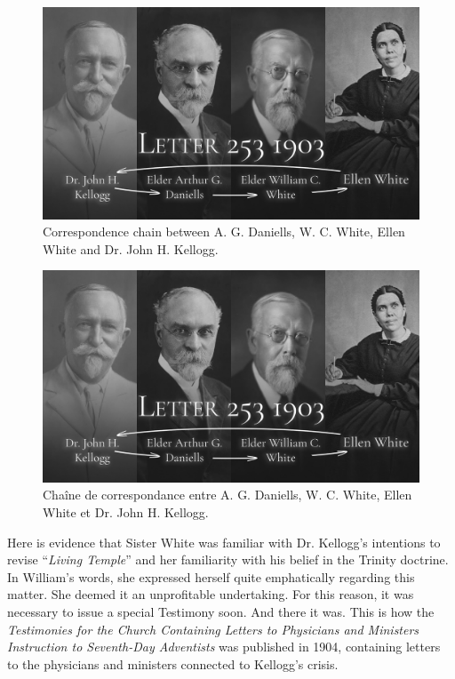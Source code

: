 \begin{figure}[h]
    \centering
    \includegraphics[width=1\linewidth]{images/correspondance.jpg}
    \caption*{Correspondence chain between A. G. Daniells, W. C. White, Ellen White and Dr. John H. Kellogg.}
    \label{fig:corespondance}
\end{figure}


\begin{figure}[h]
    \centering
    \includegraphics[width=1\linewidth]{images/correspondance.jpg}
    \caption*{Chaîne de correspondance entre A. G. Daniells, W. C. White, Ellen White et Dr. John H. Kellogg.}
    \label{fig:corespondance}
\end{figure}


Here is evidence that Sister White was familiar with Dr. Kellogg's intentions to revise “\textit{Living Temple}” and her familiarity with his belief in the Trinity doctrine. In William's words, she expressed herself quite emphatically regarding this matter. She deemed it an unprofitable undertaking. For this reason, it was necessary to issue a special Testimony soon. And there it was. This is how the \textit{Testimonies for the Church Containing Letters to Physicians and Ministers Instruction to Seventh-Day Adventists} was published in 1904, containing letters to the physicians and ministers connected to Kellogg's crisis.



